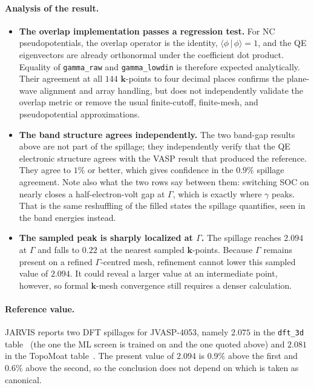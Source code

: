 \documentclass[11pt]{article}
\newcommand{\braket}[2]{\langle #1 \,\vert\, #2 \rangle}
\newcommand{\kk}{\mathbf{k}}
\begin{document}
\paragraph{Analysis of the result.}
\begin{itemize}[leftmargin=1.4em,itemsep=2pt]
\item \textbf{The overlap implementation passes a regression test.} For NC pseudopotentials, the
overlap operator is the identity, $\braket{\phi}{\phi}=1$, and the QE eigenvectors are already
orthonormal under the coefficient dot product. Equality of \texttt{gamma\_raw} and
\texttt{gamma\_lowdin} is therefore expected analytically. Their agreement at all $144$ $\kk$-points
to four decimal places confirms the
plane-wave alignment and array handling, but does not independently validate the overlap metric or
remove the usual finite-cutoff, finite-mesh, and pseudopotential approximations.
\item \textbf{The band structure agrees independently.} The two band-gap results above are not part of the
spillage; they independently verify that the QE electronic structure agrees with the VASP result that
produced the reference. They agree to $1\%$ or better, which gives confidence in the $0.9\%$
spillage agreement. Note also what the
two rows say between them: switching SOC on nearly closes a half-electron-volt gap at $\Gamma$, which
is exactly where $\gamma$ peaks. That is the same reshuffling of the filled states the spillage
quantifies, seen in the band energies instead.
\item \textbf{The sampled peak is sharply localized at $\Gamma$.} The spillage reaches $2.094$ at
$\Gamma$ and falls
to $0.22$ at the nearest sampled $\kk$-points. Because $\Gamma$ remains present on a refined
$\Gamma$-centred mesh, refinement cannot lower this sampled value of $2.094$. It could reveal a larger value at
an intermediate point, however, so formal $\kk$-mesh convergence still requires a denser calculation.
\end{itemize}

\paragraph{Reference value.} JARVIS reports two DFT spillages for JVASP-4053, namely $2.075$ in the
\texttt{dft\_3d} table~\cite{choudhary2019} (the one the ML screen is trained on and the one quoted
above) and $2.081$ in the TopoMoat table~\cite{choudhary2020npj}. The present value of $2.094$ is
$0.9\%$ above the first and $0.6\%$ above the second, so the conclusion does not depend on which is
taken as canonical.
\end{document}

